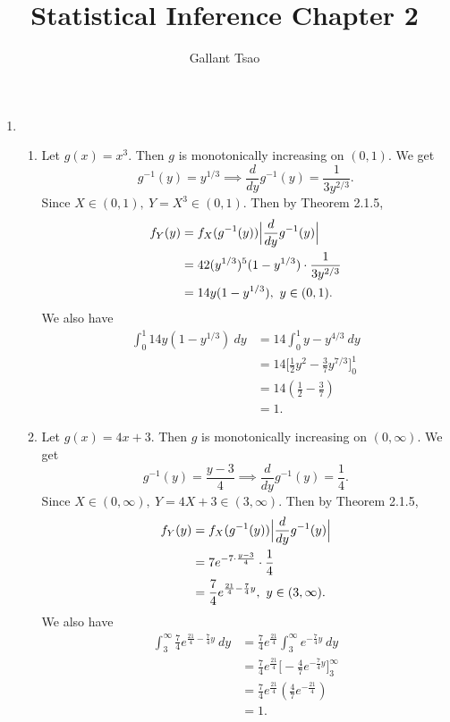 \documentclass{article}
\title{Statistical Inference Chapter 2}
\author{Gallant Tsao}
\begin{document}
\maketitle

\begin{enumerate}
    \item
    \begin{enumerate}
        \item Let $g(x)=x^3$. Then $g$ is monotonically increasing on $(0, 1)$. We get
        \[ 
        g^{-1}(y) = y^{1/3} \implies \frac{d}{dy}g^{-1}(y) = \frac{1}{3y^{2/3}}. 
        \]
        Since $X \in (0, 1), \ Y = X^3 \in (0, 1)$. Then by Theorem 2.1.5, 
        \begin{align*}
        f_{Y}(y) 
            &= f_{X}(g^{-1}(y)) \Bigl|\frac{d}{dy}g^{-1}(y)\Bigr| \\
            &= 42(y^{1/3})^{5}(1 - y^{1/3}) \cdot \frac{1}{3y^{2/3}} \\
            &= 14y(1 - y^{1/3}), \ y \in (0, 1).
        \end{align*}
        We also have 
        \begin{align*}
            \int_{0}^{1} 14y(1 - y^{1/3}) \ dy 
            &= 14\int_{0}^{1} y - y^{4/3} \ dy \\
            &= 14 \Big[ \frac{1}{2}y^2 - \frac{3}{7}y^{7/3} \Big]_{0}^{1} \\
            &= 14 ( \frac{1}{2} - \frac{3}{7}) \\
            &= 1.
        \end{align*}

        \item Let $g(x) = 4x + 3$. Then $g$ is monotonically increasing on $(0, \infty)$. We get 
        \[
        g^{-1}(y) = \frac{y - 3}{4} \implies \frac{d}{dy}g^{-1}(y) = \frac{1}{4}.
        \]
        Since $X \in  (0, \infty), \ Y = 4X + 3 \in (3, \infty)$. Then by Theorem 2.1.5,
        \begin{align*}
            f_{Y}(y)
            &= f_{X}(g^{-1}(y)) \Bigl|\frac{d}{dy}g^{-1}(y)\Bigr| \\
            &= 7e^{-7 \cdot \frac{y - 3}{4}} \cdot \frac{1}{4} \\
            &= \frac{7}{4}e^{\frac{21}{4} - \frac{7}{4}y}, \ y \in (3, \infty).
        \end{align*}
        We also have 
        \begin{align*}
            \int_{3}^{\infty} \frac{7}{4}e^{\frac{21}{4} - \frac{7}{4}y} \ dy 
            &= \frac{7}{4}e^{\frac{21}{4}} \int_{3}^{\infty} e^{-\frac{7}{4}y} \ dy \\
            &= \frac{7}{4}e^{\frac{21}{4}} \Big[ -\frac{4}{7}e^{-\frac{7}{4}y} \Big]_{3}^{\infty} \\
            &= \frac{7}{4}e^{\frac{21}{4}} (\frac{4}{7}e^{-\frac{21}{4}}) \\
            &= 1.
        \end{align*}


\end{enumerate}
\end{enumerate}
\end{document}
